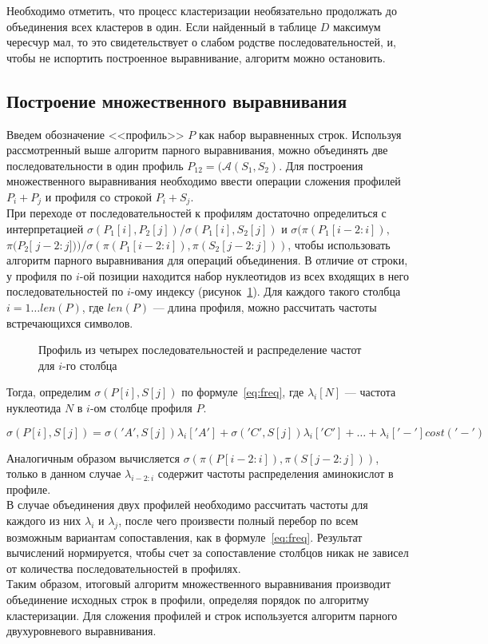 \indent Необходимо отметить, что процесс кластеризации необязательно продолжать до объединения всех кластеров в один. Если найденный в таблице $D$ максимум чересчур мал, то это свидетельствует о слабом родстве последовательностей, и, чтобы не испортить построенное выравнивание, алгоритм можно остановить.

\subsection[Построение множественного выравнивания]{\large Построение множественного выравнивания}
\hspace{\parindent} Введем обозначение <<профиль>> $P$ как набор выравненных строк. Используя рассмотренный выше алгоритм парного выравнивания, можно объединять две последовательности в один профиль $P_{12}=(\mathcal{A}(S_1, S_2)$. Для построения множественного выравнивания необходимо ввести операции сложения профилей $P_i + P_j$ и профиля со строкой $P_i + S_j$.\\
\indent При переходе от последовательностей к профилям достаточно определиться с интерпретацией $\sigma(P_1[i], P_2[j])$/$\sigma(P_1[i], S_2[j])$ и $\sigma(\pi(P_1[i-2:i]),$ $\pi(P_2[$ $j-2:j]))$/$\sigma(\pi(P_1[i-2:i]), \pi(S_2[j-2:j]))$, чтобы использовать алгоритм парного выравнивания для операций объединения. В отличие от строки, у профиля по $i$-ой позиции находится набор нуклеотидов из всех входящих в него последовательностей по $i$-ому индексу (рисунок~\ref{ris:profile}). Для каждого такого столбца $i=1 \dots len(P)$, где $len(P)$ --- длина профиля, можно рассчитать частоты встречающихся символов.

\begin{figure}[h]
	\caption{Профиль из четырех последовательностей и распределение частот для $i$-го столбца}
	\label{ris:profile}
\end{figure}

Тогда, определим $\sigma(P[i], S[j])$ по формуле~\ref{eq:freq}, где $\lambda_i[N]$ --- частота нуклеотида $N$ в $i$-ом столбце профиля $P$.

\begin{equation}\label{eq:freq}
\sigma(P[i], S[j])=\sigma('A', S[j])\lambda_i['A']+\sigma('C', S[j])\lambda_i['C']+ \dots +\lambda_i['-']cost('-')
\end{equation}

Аналогичным образом вычисляется $\sigma(\pi(P[i-2:i]), \pi(S[j-2:j]))$, только в данном случае $\lambda_{i-2:i}$ содержит частоты распределения аминокислот в профиле.\\
\indent В случае объединения двух профилей необходимо рассчитать частоты для каждого из них $\lambda_i$ и $\lambda_j$, после чего произвести полный перебор по всем возможным вариантам сопоставления, как в формуле~\ref{eq:freq}. Результат вычислений нормируется, чтобы счет за сопоставление столбцов никак не зависел от количества последовательностей в профилях.\\
\indent Таким образом, итоговый алгоритм множественного выравнивания производит объединение исходных строк в профили, определяя порядок по алгоритму кластеризации. Для сложения профилей и строк используется алгоритм парного двухуровневого выравнивания.